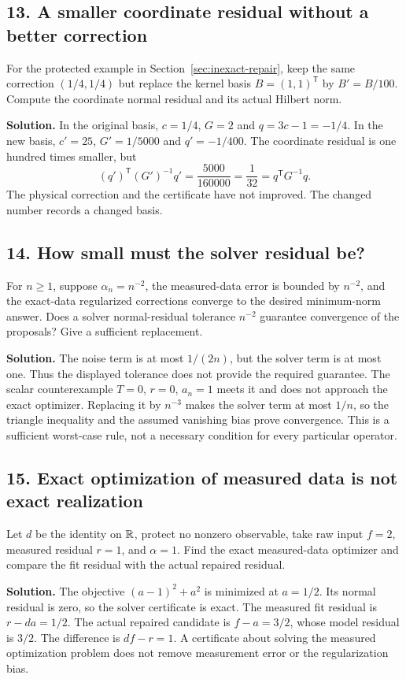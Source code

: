 \subsection*{13. A smaller coordinate residual without a better correction}
For the protected example in Section~\ref{sec:inexact-repair}, keep the same correction $(1/4,1/4)$ but replace the kernel basis $B=(1,1)^{\mathsf T}$ by $B'=B/100$. Compute the coordinate normal residual and its actual Hilbert norm.

\textbf{Solution.} In the original basis, $c=1/4$, $G=2$ and $q=3c-1=-1/4$. In the new basis, $c'=25$, $G'=1/5000$ and $q'=-1/400$. The coordinate residual is one hundred times smaller, but
\[
 (q')^{\mathsf T}(G')^{-1}q'=\frac{5000}{160000}=\frac1{32}
 =q^{\mathsf T}G^{-1}q.
\]
The physical correction and the certificate have not improved. The changed number records a changed basis.

\subsection*{14. How small must the solver residual be?}
For $n\ge1$, suppose $\alpha_n=n^{-2}$, the measured-data error is bounded by $n^{-2}$, and the exact-data regularized corrections converge to the desired minimum-norm answer. Does a solver normal-residual tolerance $n^{-2}$ guarantee convergence of the proposals? Give a sufficient replacement.

\textbf{Solution.} The noise term is at most $1/(2n)$, but the solver term is at most one. Thus the displayed tolerance does not provide the required guarantee. The scalar counterexample $T=0$, $r=0$, $a_n=1$ meets it and does not approach the exact optimizer. Replacing it by $n^{-3}$ makes the solver term at most $1/n$, so the triangle inequality and the assumed vanishing bias prove convergence. This is a sufficient worst-case rule, not a necessary condition for every particular operator.

\subsection*{15. Exact optimization of measured data is not exact realization}
Let $d$ be the identity on $\mathbb R$, protect no nonzero observable, take raw input $f=2$, measured residual $r=1$, and $\alpha=1$. Find the exact measured-data optimizer and compare the fit residual with the actual repaired residual.

\textbf{Solution.} The objective $(a-1)^2+a^2$ is minimized at $a=1/2$. Its normal residual is zero, so the solver certificate is exact. The measured fit residual is $r-da=1/2$. The actual repaired candidate is $f-a=3/2$, whose model residual is $3/2$. The difference is $df-r=1$. A certificate about solving the measured optimization problem does not remove measurement error or the regularization bias.

